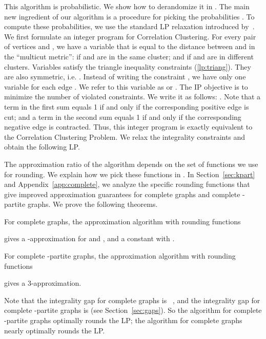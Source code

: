 \documentclass[11pt]{article}
\theoremstyle{definition}
\theoremstyle{remark}
\begin{document}
This algorithm is probabilistic. We show how to derandomize it in .
The main new ingredient of our algorithm is a procedure for picking the
probabilities .  To compute these probabilities, we use the standard LP
relaxation introduced by~\cite{CGW05}. We first formulate an integer program for
Correlation Clustering. For every pair of vertices  and , we have a
variable  that is equal to the distance between  and 
in the ``multicut metric'':  if  and  are in the same cluster;
and  if  and  are in different clusters. Variables 
satisfy the triangle inequality constraints (\ref{lp:triang}). They are also
symmetric, i.e. . Instead of writing the constraint
, we have only one variable for each edge .
We refer to this variable as  or . The IP objective
is to minimize the number of violated constraints. We write it as follows:
.
Note that a term  in the first sum equals 1 if and only if the
corresponding positive edge  is cut; and a term  in the
second sum equals 1 if and only if the corresponding negative edge  is
contracted. Thus, this integer program is exactly equivalent to the Correlation
Clustering Problem.
We relax the integrality constraints  and obtain the
following LP.



The approximation ratio of the algorithm depends on the set of functions
 we use for rounding. We explain how we pick
these functions in . In
Section~\ref{sec:kpart} and Appendix~\ref{app:complete}, we analyze the specific
rounding functions that give improved approximation guarantees for complete
graphs and complete -partite graphs. We prove the following theorems.

\begin{theorem}\label{thm:complete}
For complete graphs, the approximation algorithm with rounding functions

gives a -approximation for  and
, and a constant  with .
\end{theorem}

\begin{theorem}\label{thm:kpart}
For complete -partite graphs, the approximation algorithm with rounding functions

gives a 3-approximation.
\end{theorem}

Note that the integrality gap for complete graphs is ~\cite{CGW05}, and the
integrality gap for complete -partite graphs is  (see
Section~\ref{sec:gaps}).  So the algorithm for complete -partite graphs
optimally rounds the LP; the algorithm for complete graphs nearly optimally
rounds the LP.
\end{document}
